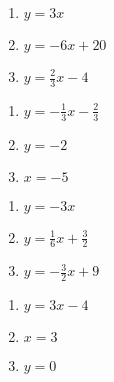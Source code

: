 \documentclass{ximera}
\begin{document}
\begin{multicols}{3}
\begin{enumerate}
\setcounter{enumi}{\value{HW}}

\item $y = 3x$
\item $y = -6x + 20$
\item $y = \frac{2}{3} x - 4$


\setcounter{HW}{\value{enumi}}
\end{enumerate}
\end{multicols}

\begin{multicols}{3}
\begin{enumerate}
\setcounter{enumi}{\value{HW}}

\item $y = -\frac{1}{3} x - \frac{2}{3}$
\item $y=-2$
\item $x=-5$


\setcounter{HW}{\value{enumi}}
\end{enumerate}
\end{multicols}


\begin{multicols}{3}
\begin{enumerate}
\setcounter{enumi}{\value{HW}}

\item $y = -3x$
\item $y = \frac{1}{6}x + \frac{3}{2}$
\item $y = -\frac{3}{2} x +9$



\setcounter{HW}{\value{enumi}}
\end{enumerate}
\end{multicols}

\begin{multicols}{3}
\begin{enumerate}
\setcounter{enumi}{\value{HW}}

\item $y = 3x-4$
\item $x=3$
\item $y=0$


\setcounter{HW}{\value{enumi}}
\end{enumerate}
\end{multicols}
\end{document}
